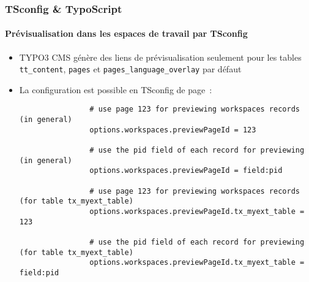 \begin{frame}[fragile]
	\frametitle{TSconfig \& TypoScript}
	\framesubtitle{Prévisualisation dans les espaces de travail par TSconfig}

	\lstset{basicstyle=\tiny\ttfamily}

	\begin{itemize}

		\item TYPO3 CMS génère des liens de prévisualisation seulement pour les tables \texttt{tt\_content},
			\texttt{pages} et \texttt{pages\_language\_overlay} par défaut

		\item La configuration est possible en TSconfig de page~:

			\begin{lstlisting}
				# use page 123 for previewing workspaces records (in general)
				options.workspaces.previewPageId = 123

				# use the pid field of each record for previewing (in general)
				options.workspaces.previewPageId = field:pid

				# use page 123 for previewing workspaces records (for table tx_myext_table)
				options.workspaces.previewPageId.tx_myext_table = 123

				# use the pid field of each record for previewing (for table tx_myext_table)
				options.workspaces.previewPageId.tx_myext_table = field:pid
			\end{lstlisting}

	\end{itemize}

\end{frame}

